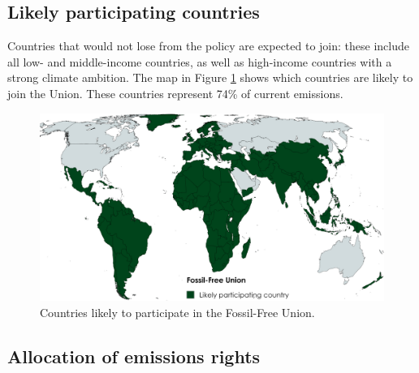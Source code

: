 \documentclass[12pt,english]{article}
\begin{document}
\subsection{Likely participating countries\label{subsec:scenarios}}

Countries that would not lose from the policy are expected to join: these include all low- and middle-income countries, as well as high-income countries with a strong climate ambition. %
The map in Figure \ref{fig:participation} shows which countries are likely to join the Union. These countries represent 74\% of current emissions. %

\begin{figure}[h]
  \centering \caption{Countries likely to participate in the Fossil-Free Union.}\label{fig:participation}
  \includegraphics[width=\textwidth]{../figures/maps/participation_FFU_wo_CAN.png} 
\end{figure}

\subsection{Allocation of emissions rights\label{subsec:allocation}}
\end{document}
